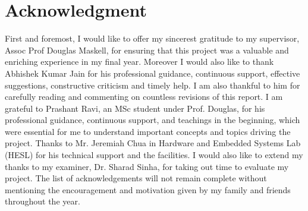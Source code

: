 \chapter*{Acknowledgment} 
\label{ch0ii_Acknowledgement}


First and foremost, I would like to offer my sincerest gratitude to my supervisor, Assoc Prof Douglas Maskell, for ensuring that this project was a valuable and enriching experience in my final year. \newline  \newline
Moreover I would also like to thank Abhishek Kumar Jain for his professional guidance, continuous support, effective suggestions, constructive criticism and timely help. I am also thankful to him for carefully reading and commenting on countless revisions of this report. \newline \newline
I am grateful to Prashant Ravi, an MSc student under Prof. Douglas, for his professional guidance, continuous support, and teachings in the beginning, which were essential for me to understand important concepts and topics driving the project. \newline \newline Thanks to Mr. Jeremiah Chua in Hardware and Embedded Systems Lab (HESL) for his technical support and the facilities.\newline \newline
I would also like to extend my thanks to my examiner, Dr. Sharad Sinha, for taking out time to evaluate my project. \newline\newline
The list of acknowledgements will not remain complete without mentioning the encouragement and motivation given by my family and friends throughout the year. \newline \newline